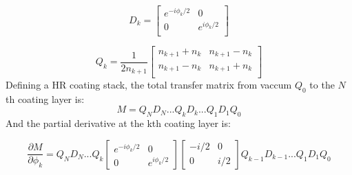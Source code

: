 \begin{equation}
D_k =
\left[ {\begin{array}{cc}
  e^{-i \phi_k / 2}& 0\\
 0 & e^{i \phi_k / 2}\\
\end{array} } \right]
\end{equation}

\begin{equation}
Q_k = \frac{1}{2n_{k+1}}
\left[ {\begin{array}{cc}
  n_{k+1} + n_k & n_{k+1} - n_k\\
 n_{k+1} - n_k & n_{k+1} + n_k\\
\end{array} } \right]
\end{equation}
\noindent Defining a HR coating stack, the total transfer matrix from vaccum $Q_0$ to the $N$th coating layer is:
\begin{equation}
	M = Q_N D_N ...Q_k D_k...Q_1D_1Q_0
\end{equation}
\noindent And the partial derivative at the kth coating layer is:

\begin{equation}
	\label{eq:partialM}
	\frac{\partial M}{\partial \phi_k} = Q_N D_N ...Q_{k} \begin{bmatrix} e^{-i \phi_k /2} & 0 \\ 0 & e^{i \phi_k/2} \end{bmatrix} \begin{bmatrix} -i /2 & 0 \\ 0 & i/2 \end{bmatrix} Q_{k-1} D_{k-1}...Q_1D_1Q_0
\end{equation}

